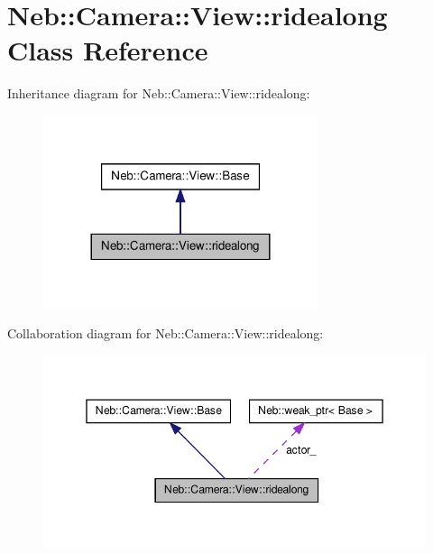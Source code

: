 \hypertarget{classNeb_1_1Camera_1_1View_1_1ridealong}{\section{\-Neb\-:\-:\-Camera\-:\-:\-View\-:\-:ridealong \-Class \-Reference}
\label{classNeb_1_1Camera_1_1View_1_1ridealong}
}


\-Inheritance diagram for \-Neb\-:\-:\-Camera\-:\-:\-View\-:\-:ridealong\-:\nopagebreak
\begin{figure}[H]
\begin{center}
\leavevmode
\includegraphics[width=228pt]{classNeb_1_1Camera_1_1View_1_1ridealong__inherit__graph}
\end{center}
\end{figure}


\-Collaboration diagram for \-Neb\-:\-:\-Camera\-:\-:\-View\-:\-:ridealong\-:\nopagebreak
\begin{figure}[H]
\begin{center}
\leavevmode
\includegraphics[width=348pt]{classNeb_1_1Camera_1_1View_1_1ridealong__coll__graph}
\end{center}
\end{figure}

